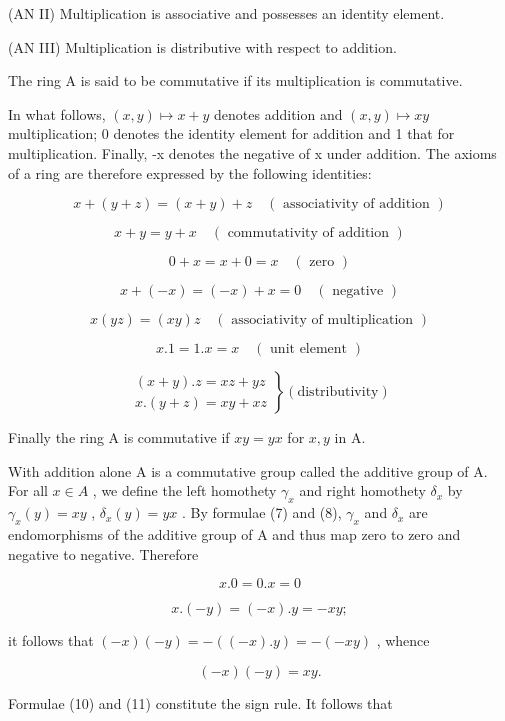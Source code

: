 (AN II) Multiplication is associative and possesses an identity element.

(AN III) Multiplication is distributive with respect to addition.

The ring A is said to be commutative if its multiplication is commutative.

In what follows, \((x,y)\mapsto x+y\) denotes addition and \((x,y)\mapsto xy\) multiplication; 0 denotes the identity element for addition and 1 that for multiplication. Finally, -x denotes the negative of x under addition. The axioms of a ring are therefore expressed by the following identities:

\[
x + (y + z) = (x + y) + z \quad (\text { associativity   of   addition })\tag{1}
\]

\[
x + y = y + x \quad (\text { commutativity   of   addition })\tag{2}
\]

\[
0 + x = x + 0 = x \quad (\text { zero })\tag{3}
\]

\[
x + (- x) = (- x) + x = 0 \quad (\text { negative })\tag{4}
\]

\[
x (y z) = (x y) z \quad (\text { associativity   of   multiplication })\tag{5}
\]

\[
x. 1 = 1. x = x \quad (\text { unit   element })\tag{6}
\]

\[
\left. \begin{array}{l} (x + y). z = x z + y z \\ x. (y + z) = x y + x z \end{array} \right\} (\text {distributivity})\tag{7, 8}
\]

Finally the ring A is commutative if \(xy = yx\) for \(x, y\) in A.

With addition alone A is a commutative group called the additive group of A. For all \(x \in A\) , we define the left homothety \(\gamma_{x}\) and right homothety \(\delta_{x}\) by \(\gamma_{x}(y) = xy\) , \(\delta_{x}(y) = yx\) . By formulae (7) and (8), \(\gamma_{x}\) and \(\delta_{x}\) are endomorphisms of the additive group of A and thus map zero to zero and negative to negative. Therefore

\[
x. 0 = 0. x = 0\tag{9}
\]

\[
x. (- y) = (- x). y = - x y;\tag{10}
\]

it follows that \((-x)(-y) = -((-x).y) = -(-xy)\) , whence

\[
(- x) (- y) = x y.\tag{11}
\]

Formulae (10) and (11) constitute the sign rule. It follows that

